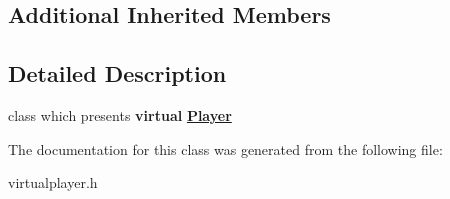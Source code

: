 \subsection*{Additional Inherited Members}


\subsection{Detailed Description}
class which presents {\bfseries{virtual}} {\bfseries{\mbox{\hyperlink{class_player}{Player}}}} 

The documentation for this class was generated from the following file\+:\begin{DoxyCompactItemize}
\item 
virtualplayer.\+h\end{DoxyCompactItemize}
